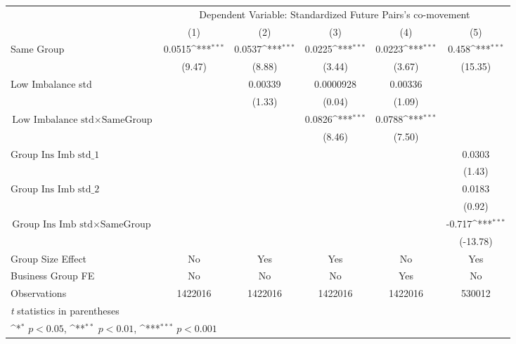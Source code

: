 {
\def\sym#1{\ifmmode^{#1}\else\(^{#1}\)\fi}
\begin{tabular}{l*{5}{c}}
\hline\hline
                &\multicolumn{5}{c}{Dependent Variable: Standardized Future Pairs's co-movement}               \\\cmidrule(lr){2-6}
                &\multicolumn{1}{c}{(1)}         &\multicolumn{1}{c}{(2)}         &\multicolumn{1}{c}{(3)}         &\multicolumn{1}{c}{(4)}         &\multicolumn{1}{c}{(5)}         \\
\hline
Same Group      &   0.0515\sym{***}&   0.0537\sym{***}&   0.0225\sym{***}&   0.0223\sym{***}&    0.458\sym{***}\\
                &   (9.47)         &   (8.88)         &   (3.44)         &   (3.67)         &  (15.35)         \\
[1em]
Low Imbalance std&                  &  0.00339         &0.0000928         &  0.00336         &                  \\
                &                  &   (1.33)         &   (0.04)         &   (1.09)         &                  \\
[1em]
 $ \text{Low Imbalance std} \times {\text{SameGroup} } $ &                  &                  &   0.0826\sym{***}&   0.0788\sym{***}&                  \\
                &                  &                  &   (8.46)         &   (7.50)         &                  \\
[1em]
 $ {\text{Group Ins Imb std}\_1} $ &                  &                  &                  &                  &   0.0303         \\
                &                  &                  &                  &                  &   (1.43)         \\
[1em]
 $ {\text{Group Ins Imb std}\_2} $ &                  &                  &                  &                  &   0.0183         \\
                &                  &                  &                  &                  &   (0.92)         \\
[1em]
$ {\text{Group Ins Imb std} } \times {\text{SameGroup} }  $ &                  &                  &                  &                  &   -0.717\sym{***}\\
                &                  &                  &                  &                  & (-13.78)         \\
\hline
Group Size Effect&       No         &      Yes         &      Yes         &       No         &      Yes         \\
Business Group FE&       No         &       No         &       No         &      Yes         &       No         \\
Observations    &  1422016         &  1422016         &  1422016         &  1422016         &   530012         \\
\hline\hline
\multicolumn{6}{l}{\footnotesize \textit{t} statistics in parentheses}\\
\multicolumn{6}{l}{\footnotesize \sym{*} \(p<0.05\), \sym{**} \(p<0.01\), \sym{***} \(p<0.001\)}\\
\end{tabular}
}

